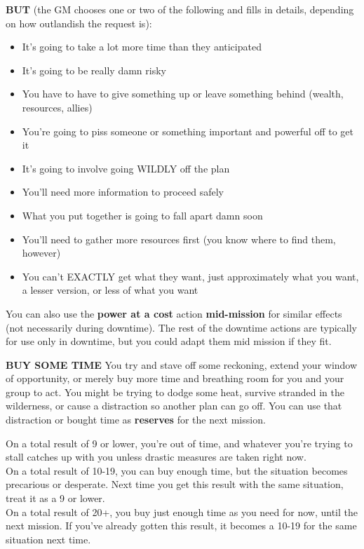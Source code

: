 \textbf{BUT} (the GM chooses one or two of the following and fills in details, depending on how outlandish the request is):
\begin{itemize}
\item It’s going to take a lot more time than they anticipated
\item It’s going to be really damn risky
\item You have to have to give something up or leave something behind (wealth, resources, allies)
\item You’re going to piss someone or something important and powerful off to get it
\item It’s going to involve going WILDLY off the plan
\item You’ll need more information to proceed safely
\item What you put together is going to fall apart damn soon
\item You’ll need to gather more resources first (you know where to find them, however)
\item You can’t EXACTLY get what they want, just approximately what you want, a lesser version, or less of what you want
\end{itemize}  

You can also use the \textbf{power at a cost} action \textbf{mid-mission} for similar effects (not necessarily during downtime). The rest of the downtime actions are typically for use only in downtime, but you could adapt them mid mission if they fit.


\textbf{BUY SOME TIME}
You try and stave off some reckoning, extend your window of opportunity, or merely buy more time and breathing room for you and your group to act. You might be trying to dodge some heat, survive stranded in the wilderness, or cause a distraction so another plan can go off. You can use that distraction or bought time as \textbf{reserves} for the next mission.

On a total result of 9 or lower, you’re out of time, and whatever you’re trying to stall catches up with you unless drastic measures are taken right now.\\
On a total result of 10-19, you can buy enough time, but the situation becomes precarious or desperate. Next time you get this result with the same situation, treat it as a 9 or lower.\\
On a total result of 20+, you buy just enough time as you need for now, until the next mission. If you’ve already gotten this result, it becomes a 10-19 for the same situation next time.

